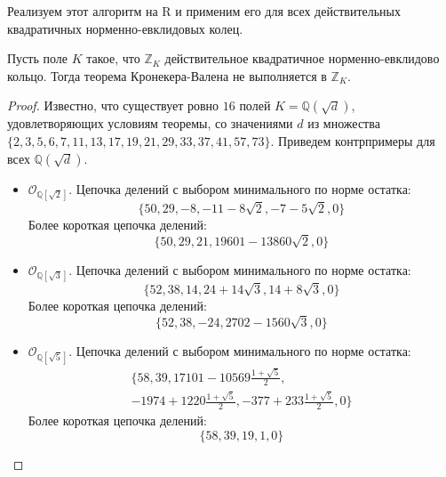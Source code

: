 \documentclass[_00_dissertation.tex]{subfiles}
\begin{document}
Реализуем этот алгоритм на R и применим его для всех действительных квадратичных норменно-евклидовых колец.

\begin{theorem}\label{theorem:kronecker}
    Пусть поле $K$ такое, что $\mathbb{Z}_K$ действительное квадратичное норменно-евклидово кольцо.
    Тогда теорема Кронекера-Валена не выполняется в $\mathbb{Z}_K$.
\end{theorem}
\begin{proof}
    Известно, что существует ровно $16$ полей $K = \mathbb{Q}(\sqrt{d})$, удовлетворяющих условиям теоремы, со значениями $d$ из множества $\{2, 3, 5, 6, 7, 11, 13, 17, 19, 21, 29, 33, 37, 41, 57, 73\}$.
    Приведем контрпримеры для всех $\mathbb{Q}(\sqrt{d})$.

    \begin{itemize}
        \item $\mathcal{O}_{\mathbb{Q}[\sqrt{2}]}$.
        Цепочка делений с выбором минимального по норме остатка:
        \begin{equation*}
            \{50, 29, -8, -11-8\sqrt{2}, -7-5\sqrt{2}, 0\}
        \end{equation*}
        Более короткая цепочка делений:
        \begin{equation*}
            \{50, 29, 21, 19601-13860\sqrt{2}, 0\}
        \end{equation*}

        \item $\mathcal{O}_{\mathbb{Q}[\sqrt{3}]}$.
        Цепочка делений с выбором минимального по норме остатка:
        \begin{equation*}
            \{52, 38, 14, 24+14\sqrt{3}, 14+8\sqrt{3}, 0\}
        \end{equation*}
        Более короткая цепочка делений:
        \begin{equation*}
            \{52, 38, -24, 2702-1560\sqrt{3}, 0\}
        \end{equation*}

        \item $\mathcal{O}_{\mathbb{Q}[\sqrt{5}]}$.
        Цепочка делений с выбором минимального по норме остатка:
        \begin{multline*}
            \{58, 39, 17101-10569\frac{1+\sqrt{5}}{2},\\
            -1974+1220\frac{1+\sqrt{5}}{2}, -377+233\frac{1+\sqrt{5}}{2}, 0\}
        \end{multline*}
        Более короткая цепочка делений:
        \begin{equation*}
            \{58, 39, 19, 1, 0\}
        \end{equation*}


\end{itemize}
\end{proof}
\end{document}
